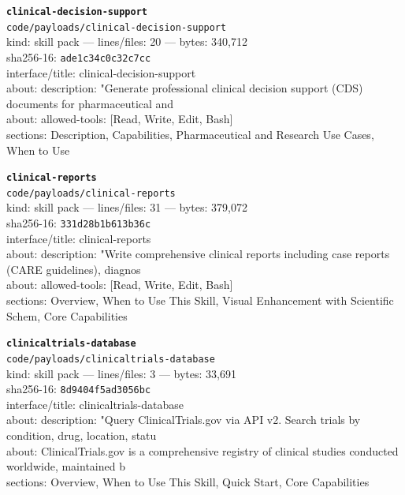 \noindent\textbf{\texttt{clinical-decision-support}}\\
\texttt{code/payloads/clinical-decision-support}\\
kind: skill pack --- lines/files: 20 --- bytes: 340,712\\
sha256-16: \texttt{ade1c34c0c32c7cc}\\
interface/title: clinical-decision-support\\
about: description: "Generate professional clinical decision support (CDS) documents for pharmaceutical and\\
about: allowed-tools: [Read, Write, Edit, Bash]\\
sections: Description, Capabilities, Pharmaceutical and Research Use Cases, When to Use\\
\vspace*{6.0pt}

\noindent\textbf{\texttt{clinical-reports}}\\
\texttt{code/payloads/clinical-reports}\\
kind: skill pack --- lines/files: 31 --- bytes: 379,072\\
sha256-16: \texttt{331d28b1b613b36c}\\
interface/title: clinical-reports\\
about: description: "Write comprehensive clinical reports including case reports (CARE guidelines), diagnos\\
about: allowed-tools: [Read, Write, Edit, Bash]\\
sections: Overview, When to Use This Skill, Visual Enhancement with Scientific Schem, Core Capabilities\\
\vspace*{6.0pt}

\noindent\textbf{\texttt{clinicaltrials-database}}\\
\texttt{code/payloads/clinicaltrials-database}\\
kind: skill pack --- lines/files: 3 --- bytes: 33,691\\
sha256-16: \texttt{8d9404f5ad3056bc}\\
interface/title: clinicaltrials-database\\
about: description: "Query ClinicalTrials.gov via API v2. Search trials by condition, drug, location, statu\\
about: ClinicalTrials.gov is a comprehensive registry of clinical studies conducted worldwide, maintained b\\
sections: Overview, When to Use This Skill, Quick Start, Core Capabilities\\
\vspace*{6.0pt}

